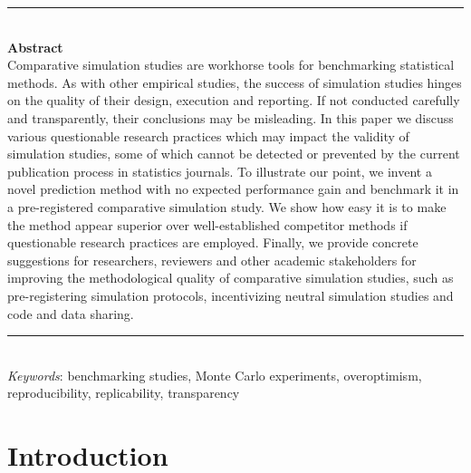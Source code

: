 \documentclass[a4paper, 11pt]{article}
\title{
  \vspace{-4em}
  \textbf{\longtitle} \\
  \subtitle
}
\author{
  \textbf{\longauthors} \\
  \affiliation \\
  \small\{samuel.pawel, lucasheinrich.kook, kelly.reeve\}@uzh.ch
}
\date{} %
\begin{document}
\maketitle

\begin{center}
  \begin{minipage}{13cm} {\small
      \rule{\textwidth}{0.5pt} \\
      {\centering \textbf{Abstract} \\
        Comparative simulation studies are workhorse tools for benchmarking
        statistical methods. As with other empirical studies, the success of
        simulation studies hinges on the quality of their design, execution and
        reporting. If not conducted carefully and transparently, their
        conclusions may be misleading. In this paper we discuss various
        questionable research practices which may impact the validity of
        simulation studies, some of which cannot be detected or prevented by the
        current publication process in statistics journals. To illustrate our
        point, we invent a novel prediction method with no expected performance
        gain and benchmark it in a pre-registered comparative simulation study.
        We show how easy it is to make the method appear superior over
        well-established competitor methods if questionable research practices
        are employed. Finally, we provide concrete suggestions for researchers,
        reviewers and other academic stakeholders for improving the
        methodological quality of comparative simulation studies, such as
        pre-registering simulation protocols, incentivizing neutral simulation
        studies and code and data sharing. }
      \rule{\textwidth}{0.4pt} \\
      \textit{Keywords}: benchmarking studies, Monte Carlo experiments,
      overoptimism, reproducibility, replicability, transparency }
\end{minipage}
\end{center}

\section{Introduction}

\end{document}
